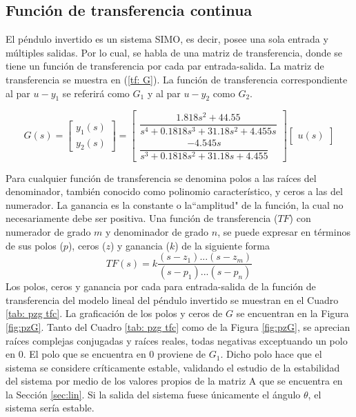 \documentclass[journal]{IEEEtran}
\begin{document}
\subsection{Función de transferencia continua}\label{sub:ftc}
El péndulo invertido es un sistema SIMO, es decir, posee una sola entrada y múltiples salidas. Por lo cual, se habla de una matriz de transferencia, donde se tiene un función de transferencia por cada par entrada-salida. La matriz de transferencia se muestra en (\ref{tf: G}). La función de transferencia correspondiente al par $u-y_1$ se referirá como $G_1$ y al par $u-y_2$ como $G_2$.

\begin{equation}
\label{tf: G}
 G(s) = \begin{bmatrix}
	y_1(s)\\
	y_2(s)
\end{bmatrix} = 
\begin{bmatrix}
    \dfrac{1.818 s^2 + 44.55}{s^4 + 0.1818 s^3 + 31.18 s^2 + 4.455 s}\\
	\dfrac{-4.545 s}{s^3 + 0.1818 s^2 + 31.18 s + 4.455}
\end{bmatrix}
\begin{bmatrix}
	u(s)
\end{bmatrix}
\end{equation}
\textbf{}

Para cualquier función de transferencia se denomina polos a las raíces del denominador, también conocido como polinomio característico, y ceros a las del numerador. La ganancia es la constante o la``amplitud" de la función, la cual no necesariamente debe ser positiva. Una función de transferencia ($TF$) con numerador de grado $m$ y denominador de grado $n$, se puede expresar en términos de sus polos ($p$), ceros ($z$) y ganancia ($k$) de la siguiente forma
\[
TF(s) = k\dfrac{(s - z_1)...(s - z_m)}{(s - p_1)...(s - p_n)}
\]
Los polos, ceros y ganancia por cada para entrada-salida de la función de transferencia del modelo lineal del péndulo invertido se muestran en el Cuadro \ref{tab: pzg tfc}. La graficación de los polos y ceros de $G$ se encuentran en la Figura \ref{fig:pzG}. Tanto del Cuadro \ref{tab: pzg tfc} como de la Figura \ref{fig:pzG}, se aprecian raíces complejas conjugadas y raíces reales, todas negativas exceptuando un polo en 0. El polo que se encuentra en 0 proviene de $G_1$. Dicho polo hace que el sistema se considere críticamente estable, validando el estudio de la estabilidad del sistema por medio de los valores propios de la matriz A que se encuentra en la Sección \ref{sec:lin}. Si la salida del sistema fuese únicamente el ángulo $\theta$, el sistema sería estable.\\
\end{document}
